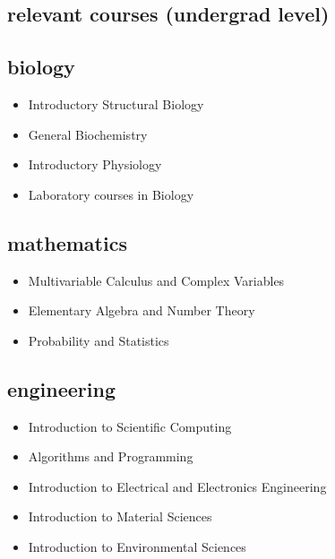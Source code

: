\documentclass[11pt]{friggeri-cv}
\begin{document}
\begin{multicols}{2}[]
\begin{minipage}{1.05\columnwidth}
\end{minipage}



\begin{minipage}{1.05\columnwidth}



\section{relevant courses (undergrad level)}

\subsection{biology}
\begin{itemize}
\item Introductory Structural Biology
\item General Biochemistry
\item Introductory Physiology
\item Laboratory courses in Biology
\end{itemize}


\subsection{mathematics}
\begin{itemize}
\item Multivariable Calculus and Complex Variables
\item Elementary Algebra and Number Theory
\item Probability and Statistics
\end{itemize}



\subsection{engineering}
\begin{itemize}
\item Introduction to Scientific Computing
\item Algorithms and Programming
\item Introduction to Electrical and Electronics Engineering
\item Introduction to Material Sciences
\item Introduction to Environmental Sciences
\end{itemize}

\end{minipage}

\end{multicols}
\end{document}
